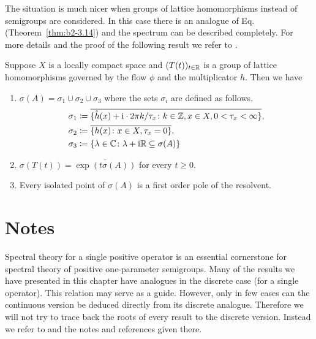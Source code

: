 The situation is much nicer when groups of lattice homomorphisms instead of semigroups are considered.
In this case there is an analogue of Eq.~ (\cf Theorem~\ref{thm:b2-3.14}) and the spectrum can be described completely.
For more details and the proof of the following result we refer to \textcite{arendtgreiner:1984}.
\begin{theorem}\label{thm:b3-4.11}
	Suppose $X$ is a locally compact space and $(T(t))_{t\in\mathbb{R}}$ is a group of lattice homomorphisms
    governed by the flow $\phi$ and the multiplicator $h$.
	Then we have
	\begin{enumerate}[\upshape (i)]
		\item 
		$\sigma(A) = \sigma_{1}\cup\sigma_{2}\cup\sigma_{3}$ where the sets $\sigma_{i}$ are defined as follows.
		\[\begin{aligned}
			\sigma_{1} &\coloneq \overline{\{\hat{h}(x) + \mathrm{i}\cdot 2\pi k/\tau_{x} \colon k \in \mathbb{Z}, x \in X, 0 < \tau_{x} < \infty\}} , \\
			\sigma_{2} &\coloneq \overline{\{h(x) \colon x \in X, \tau_{x} = 0\}} ,  \\
			\sigma_{3} &\coloneq \{\lambda \in \mathbb{C} \colon \lambda + \mathrm{i}\mathbb{R} \subseteq \sigma(A)\}
		\end{aligned}\]
		
		\item 
		$\sigma(T(t)) = \overline{\exp(t\sigma(A))}$ for every $t \geq 0$.
		
		\item 
		Every isolated point of\/ $\sigma(A)$ is a first order pole of the resolvent.
	\end{enumerate}
\end{theorem}
\section*{Notes}
Spectral theory for a single positive operator is an essential cornerstone for spectral theory of positive one-parameter semigroups.
Many of the results we have presented in this chapter have analogues in the discrete case (\ie for a single operator).
This relation may serve as a guide.
However, only in few cases can the continuous version be deduced directly from its discrete analogue.
Therefore we will not try to trace back the roots of every result to the discrete version.
Instead we refer to \textcite{schaefer:1974} and the notes and references given there.


